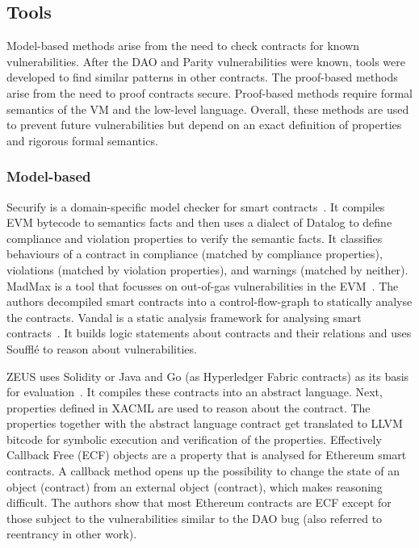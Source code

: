 


\subsection{Tools}
Model-based methods arise from the need to check contracts for known vulnerabilities. After the DAO and Parity vulnerabilities were known, tools were developed to find similar patterns in other contracts. The proof-based methods arise from the need to proof contracts secure. Proof-based methods require formal semantics of the VM and the low-level language. Overall, these methods are used to prevent future vulnerabilities but depend on an exact definition of properties and rigorous formal semantics.

\subsubsection{Model-based}
Securify is a domain-specific model checker for smart contracts~\cite{Tsankov2017}. It compiles EVM bytecode to semantics facts and then uses a dialect of Datalog to define compliance and violation properties to verify the semantic facts. It classifies behaviours of a contract in compliance (matched by compliance properties), violations (matched by violation properties), and warnings (matched by neither). 
MadMax is a tool that focusses on out-of-gas vulnerabilities in the EVM~\cite{Grech2018}.
The authors decompiled smart contracts into a control-flow-graph to statically analyse the contracts.
Vandal is a static analysis framework for analysing smart contracts~\cite{Brent2018}.
It builds logic statements about contracts and their relations and uses Souffl\'{e} to reason about vulnerabilities.

ZEUS uses Solidity or Java and Go (as Hyperledger Fabric contracts) as its basis for evaluation~\cite{Kalra2018}. It compiles these contracts into an abstract language. Next, properties defined in XACML are used to reason about the contract. The properties together with the abstract language contract get translated to LLVM bitcode for symbolic execution and verification of the properties.
Effectively Callback Free (ECF) objects are a property that is analysed for Ethereum smart contracts\cite{Grossman2017}. A callback method opens up the possibility to change the state of an object (contract) from an external object (contract), which makes reasoning difficult. 
The authors show that most Ethereum contracts are ECF except for those subject to the vulnerabilities similar to the DAO bug (also referred to reentrancy in other work).

